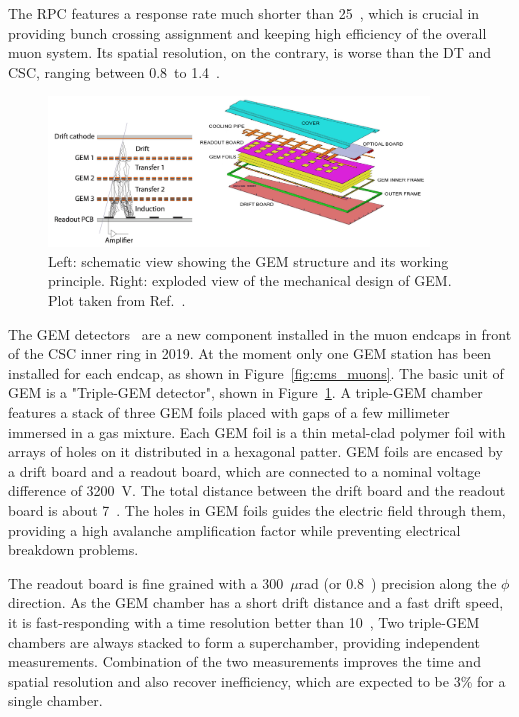 The RPC features a response rate much shorter than 25~\ns,
which is crucial in providing bunch crossing assignment and keeping high efficiency of the overall muon system.
Its spatial resolution, on the contrary, is worse than the DT and CSC, ranging between 0.8~\cm to 1.4~\cm.

\begin{figure}[!htb]
    \centering
    \captionsetup{justification=justified}
    \includegraphics[width=0.90\textwidth]{pics/LHC_CMS/GEM.png}
    \caption{Left: schematic view showing the GEM structure and its working principle.
             Right: exploded view of the mechanical design of GEM.
             Plot taken from Ref.~\cite{Colaleo:2021453}.}
    \label{fig:cms_gem}
\end{figure}

The GEM detectors~\cite{Colaleo:2021453} are a new component installed in the muon endcaps in front of the CSC inner ring in 2019.
At the moment only one GEM station has been installed for each endcap, as shown in Figure~\ref{fig:cms_muons}.
The basic unit of GEM is a "Triple-GEM detector", shown in Figure~\ref{fig:cms_gem}.
A triple-GEM chamber features a stack of three GEM foils placed with gaps of a few millimeter immersed in a gas mixture.
Each GEM foil is a thin metal-clad polymer foil with arrays of holes on it distributed in a hexagonal patter. 
GEM foils are encased by a drift board and a readout board, which are connected to a nominal voltage difference of 3200~V.
The total distance between the drift board and the readout board is about 7~\mm.
The holes in GEM foils guides the electric field through them, providing a high avalanche amplification factor while preventing electrical breakdown problems.

The readout board is fine grained with a 300~$\mu$rad (or 0.8~\mm) precision along the $\phi$ direction.
As the GEM chamber has a short drift distance and a fast drift speed, it is fast-responding with a time resolution better than 10~\ns, 
Two triple-GEM chambers are always stacked to form a superchamber, providing independent measurements.
Combination of the two measurements improves the time and spatial resolution and also recover inefficiency, which are expected to be 3\% for a single chamber.

